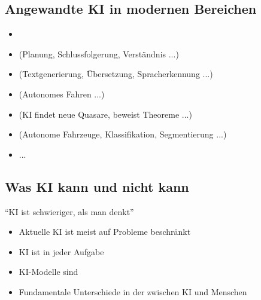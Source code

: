 \subsection{Angewandte KI in modernen Bereichen}
\begin{itemize}
    \item {}
    \item {} (Planung, Schlussfolgerung, Verständnis ...)
    \item {} (Textgenerierung, Übersetzung, Spracherkennung ...)
    \item {} (Autonomes Fahren ...)
    \item {} (KI findet neue Quasare, beweist Theoreme ...)
    \item {} (Autonome Fahrzeuge, Klassifikation, Segmentierung ...)
    \item ...
\end{itemize}
\subsection{Was KI kann und nicht kann}
\enquote{KI ist schwieriger, als man denkt}
\begin{itemize}
    \item Aktuelle KI ist meist auf  Probleme beschränkt
    \item KI ist  in jeder Aufgabe 
    \item KI-Modelle sind 
    \item Fundamentale Unterschiede in der  zwischen KI und Menschen
\end{itemize}